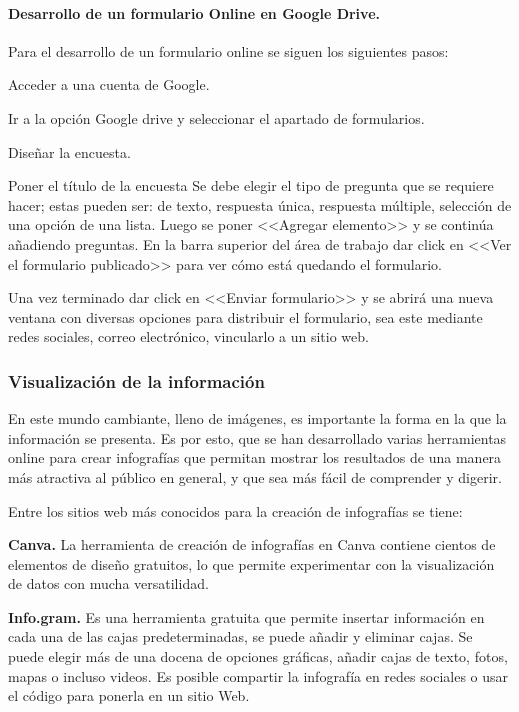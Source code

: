 \documentclass[a5paper,doc,10pt,noapacite]{apa6}
\begin{document}
{{\paragraph{Desarrollo de un formulario Online en Google Drive.}

Para el desarrollo de un formulario online se siguen los siguientes pasos:

\begin{APAenumerate}
\item Acceder a una cuenta de Google. 
\item Ir a la opción Google drive y seleccionar el apartado de formularios. 
\item Diseñar la encuesta.

\subitem Poner el título de la encuesta 
\subitem Se debe elegir el tipo de pregunta que se requiere hacer; estas pueden ser: de texto, respuesta única, respuesta múltiple, selección de una opción de una lista.
\subitem Luego se poner <<Agregar elemento>> y se continúa añadiendo preguntas. 
\subitem En la barra superior del área de trabajo dar click en <<Ver el formulario publicado>> para ver cómo está quedando el formulario.

\item Una vez terminado dar click en <<Enviar formulario>> y se abrirá una nueva ventana con diversas opciones para distribuir el formulario, sea este mediante redes sociales, correo electrónico, vincularlo a un sitio web. 
\end{APAenumerate}

\subsubsection{Visualización de la información}
En este mundo cambiante, lleno de imágenes, es importante la forma en la que la información se presenta. Es por esto, que se han desarrollado varias herramientas online para crear infografías que permitan mostrar los resultados de una manera más atractiva al público en general, y que sea más fácil de comprender y digerir.

Entre los sitios web más conocidos para la creación de infografías se tiene:

\vspace{1\baselineskip}
\textbf{Canva.}
La herramienta de creación de infografías en Canva contiene cientos de elementos de diseño  gratuitos, lo que permite experimentar con la visualización de datos con mucha versatilidad.

\textbf{Info.gram.}
Es una herramienta gratuita que permite insertar información en cada una de las cajas predeterminadas, se puede añadir y eliminar cajas. Se puede elegir más de una docena de opciones gráficas, añadir cajas de texto, fotos, mapas o incluso videos. Es posible compartir la infografía en redes sociales o usar el código para ponerla en un sitio Web.

}}
\end{document}
